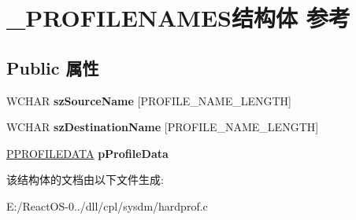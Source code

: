 \hypertarget{struct___p_r_o_f_i_l_e_n_a_m_e_s}{}\section{\+\_\+\+P\+R\+O\+F\+I\+L\+E\+N\+A\+M\+E\+S结构体 参考}
\label{struct___p_r_o_f_i_l_e_n_a_m_e_s}
\subsection*{Public 属性}
\begin{DoxyCompactItemize}
\item 
\mbox{\label{struct___p_r_o_f_i_l_e_n_a_m_e_s_ad897121859466e0e9adaa6afd72335c9}} 
W\+C\+H\+AR {\bfseries sz\+Source\+Name} \mbox{[}P\+R\+O\+F\+I\+L\+E\+\_\+\+N\+A\+M\+E\+\_\+\+L\+E\+N\+G\+TH\mbox{]}
\item 
\mbox{\label{struct___p_r_o_f_i_l_e_n_a_m_e_s_ac6adbe8c352560fd4d6dad690cab71be}} 
W\+C\+H\+AR {\bfseries sz\+Destination\+Name} \mbox{[}P\+R\+O\+F\+I\+L\+E\+\_\+\+N\+A\+M\+E\+\_\+\+L\+E\+N\+G\+TH\mbox{]}
\item 
\mbox{\label{struct___p_r_o_f_i_l_e_n_a_m_e_s_ad0deef31ca8813dd2550d2014c4e9d44}} 
\hyperlink{struct___p_r_o_f_i_l_e_d_a_t_a}{P\+P\+R\+O\+F\+I\+L\+E\+D\+A\+TA} {\bfseries p\+Profile\+Data}
\end{DoxyCompactItemize}


该结构体的文档由以下文件生成\+:\begin{DoxyCompactItemize}
\item 
E\+:/\+React\+O\+S-\/0../dll/cpl/sysdm/hardprof.\+c\end{DoxyCompactItemize}
